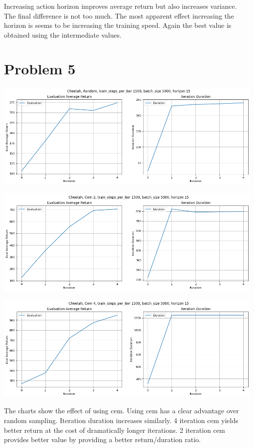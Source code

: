 \documentclass[11pt]{article}
\begin{document}
    Increasing action horizon improves average return but also increases variance.
    The final difference is not too much.
    The most apparent effect increasing the horizon is seems to be increasing the training speed.
    Again the best value is obtained using the intermediate values.

    \section*{Problem 5}

    \hspace*{-0.6in}
    \includegraphics[scale=0.5]{q5/random}

    \hspace*{-0.6in}
    \includegraphics[scale=0.5]{q5/cem2}

    \hspace*{-0.6in}
    \includegraphics[scale=0.5]{q5/cem4}

    The charts show the effect of using cem.
    Using cem has a clear advantage over random sampling.
    Iteration duration increases similarly.
    4 iteration cem yields better return at the cost of dramatically longer iterations.
    2 iteration cem provides better value by providing a better return/duration ratio.
\end{document}
